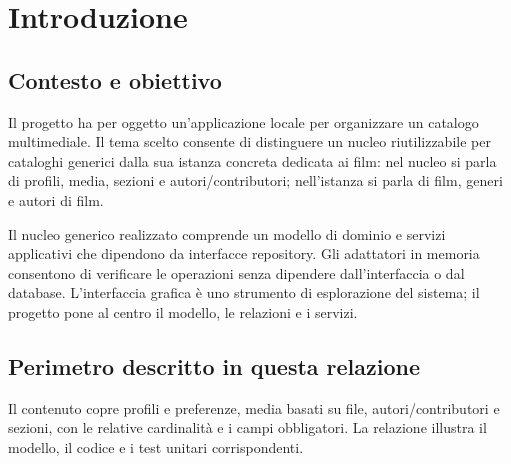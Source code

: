 \chapter{Introduzione}

\section{Contesto e obiettivo}
Il progetto ha per oggetto un'applicazione locale per organizzare un catalogo multimediale. Il tema scelto consente di distinguere un nucleo riutilizzabile per cataloghi generici dalla sua istanza concreta dedicata ai film: nel nucleo si parla di profili, media, sezioni e autori/contributori; nell'istanza si parla di film, generi e autori di film.

Il nucleo generico realizzato comprende un modello di dominio e servizi applicativi che dipendono da interfacce repository. Gli adattatori in memoria consentono di verificare le operazioni senza dipendere dall'interfaccia o dal database. L'interfaccia grafica è uno strumento di esplorazione del sistema; il progetto pone al centro il modello, le relazioni e i servizi.

\section{Perimetro descritto in questa relazione}
Il contenuto copre profili e preferenze, media basati su file, autori/contributori e sezioni, con le relative cardinalità e i campi obbligatori. La relazione illustra il modello, il codice e i test unitari corrispondenti.
